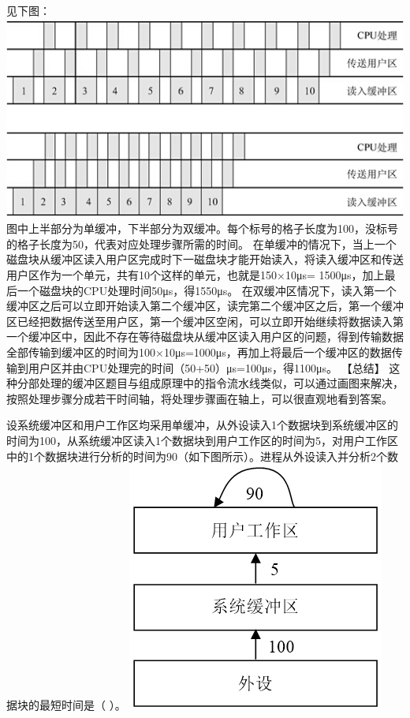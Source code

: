 \begin{solution}见下图：
\includegraphics[width=5.33333in,height=2.62500in]{computerassets/a01088e1ad64284318d10c440d72b7f2.jpeg}
图中上半部分为单缓冲，下半部分为双缓冲。每个标号的格子长度为100，没标号的格子长度为50，代表对应处理步骤所需的时间。
在单缓冲的情况下，当上一个磁盘块从缓冲区读入用户区完成时下一磁盘块才能开始读入，将读入缓冲区和传送用户区作为一个单元，共有10个这样的单元，也就是150×10μs=
1500μs，加上最后一个磁盘块的CPU处理时间50μs，得1550μs。
在双缓冲区情况下，读入第一个缓冲区之后可以立即开始读入第二个缓冲区，读完第二个缓冲区之后，第一个缓冲区已经把数据传送至用户区，第一个缓冲区空闲，可以立即开始继续将数据读入第一个缓冲区中，因此不存在等待磁盘块从缓冲区读入用户区的问题，得到传输数据全部传输到缓冲区的时间为100×10μs=1000μs，再加上将最后一个缓冲区的数据传输到用户区并由CPU处理完的时间（50+50）μs=100μs，得1100μs。
【总结】
这种分部处理的缓冲区题目与组成原理中的指令流水线类似，可以通过画图来解决，按照处理步骤分成若干时间轴，将处理步骤画在轴上，可以很直观地看到答案。
\end{solution}
\question 设系统缓冲区和用户工作区均采用单缓冲，从外设读入1个数据块到系统缓冲区的时间为100，从系统缓冲区读入1个数据块到用户工作区的时间为5，对用户工作区中的1个数据块进行分析的时间为90（如下图所示）。进程从外设读入并分析2个数据块的最短时间是（
）。
\includegraphics[width=3.33333in,height=3.23958in]{computerassets/815C069B515DDB872D4B79D177AF07B7.png}
